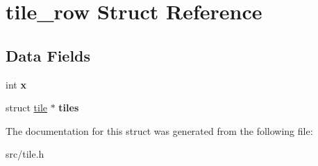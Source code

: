\hypertarget{structtile__row}{}\section{tile\+\_\+row Struct Reference}
\label{structtile__row}
\subsection*{Data Fields}
\begin{DoxyCompactItemize}
\item 
\hypertarget{structtile__row_a0849e7ac7751d2d84a45b7d501c760ee}{}int {\bfseries x}\label{structtile__row_a0849e7ac7751d2d84a45b7d501c760ee}

\item 
\hypertarget{structtile__row_ac50f6d47a7dc3e0015ff3e398e9217d2}{}struct \hyperlink{structtile}{tile} $\ast$ {\bfseries tiles}\label{structtile__row_ac50f6d47a7dc3e0015ff3e398e9217d2}

\end{DoxyCompactItemize}


The documentation for this struct was generated from the following file\+:\begin{DoxyCompactItemize}
\item 
src/tile.\+h\end{DoxyCompactItemize}
